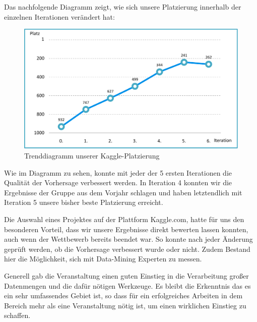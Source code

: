 Das nachfolgende Diagramm zeigt, wie sich unsere Platzierung innerhalb der einzelnen Iterationen verändert hat:

\begin{figure}[H]
\centering
\includegraphics[width=0.85\linewidth]{Bilder/Trenddiagramm_Platzierungen}
\caption{Trenddiagramm unserer Kaggle-Platzierung}
\label{fig:Trenddiagramm_Platzierungen}
\end{figure}

Wie im Diagramm zu sehen, konnte mit jeder der 5 ersten Iterationen die Qualität der Vorhersage verbessert werden. In Iteration 4 konnten wir die Ergebnisse der Gruppe aus dem Vorjahr schlagen und haben letztendlich mit Iteration 5 unsere bisher beste Platzierung erreicht.

Die Auswahl eines Projektes auf der Plattform Kaggle.com, hatte für uns den besonderen Vorteil, dass wir unsere Ergebnisse direkt bewerten lassen konnten, auch wenn der Wettbewerb bereits beendet war. So konnte nach jeder Änderung geprüft werden, ob die Vorhersage verbessert wurde oder nicht. Zudem Bestand hier die Möglichkeit, sich mit Data-Mining Experten zu messen.

Generell gab die Veranstaltung einen guten Einstieg in die Verarbeitung großer Datenmengen und die dafür nötigen Werkzeuge. Es bleibt die Erkenntnis das es ein sehr umfassendes Gebiet ist, so dass für ein erfolgreiches Arbeiten in dem Bereich mehr als eine Veranstaltung nötig ist, um einen wirklichen Einstieg zu schaffen.
